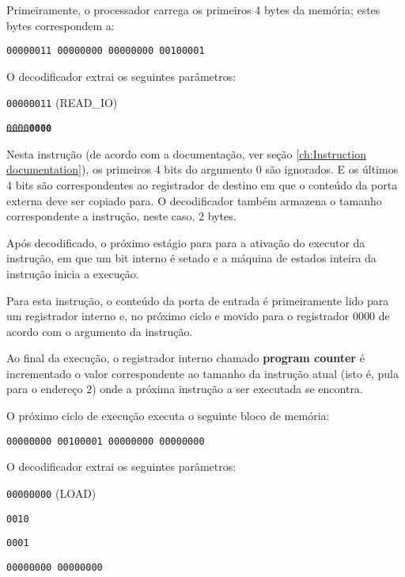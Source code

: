 \documentclass[11pt]{report}
\begin{document}
Primeiramente, o processador carrega os primeiros 4 bytes da memória; estes bytes correspondem a:

\begin{lstlisting}
00000011 00000000 00000000 00100001
\end{lstlisting}

O decodificador extrai os seguintes parâmetros:
\begin{description}[style=multiline,topsep=10pt,leftmargin=5cm]
	\item[Opcode] \texttt{00000011} (READ\_IO)
	\item[Argumento 0] \texttt{\st{0000}\textbf{0000}}
\end{description}

Nesta instrução (de acordo com a documentação, ver seção \ref{ch:Instruction documentation}), os primeiros 4 bits do argumento 0 são ignorados. E os últimos 4 bits são correspondentes ao registrador de destino em que o conteúdo da porta externa deve ser copiado para. O decodificador também armazena o tamanho correspondente a instrução, neste caso, 2 bytes.

Após decodificado, o próximo estágio para para a ativação do executor da instrução, em que um bit interno é setado e a máquina de estados inteira da instrução inicia a execução.

Para esta instrução, o conteúdo da porta de entrada é primeiramente lido para um registrador interno e, no próximo ciclo e movido para o registrador 0000 de acordo com o argumento da instrução.

Ao final da execução, o registrador interno chamado \textbf{program counter} é incrementado o valor correspondente ao tamanho da instrução atual (isto é, pula para o endereço $2$) onde a próxima instrução a ser executada se encontra.

O próximo ciclo de execução executa o seguinte bloco de memória:
\begin{lstlisting}
00000000 00100001 00000000 00000000
\end{lstlisting}

O decodificador extrai os seguintes parâmetros:
\begin{description}[style=multiline,topsep=10pt,leftmargin=5cm]
	\item[Opcode] \texttt{00000000} (LOAD)
	\item[Argumento 0] \texttt{0010}
	\item[Argumento 1] \texttt{0001}
	\item[Argumento 2] \texttt{00000000 00000000}
\end{description}
\end{document}
